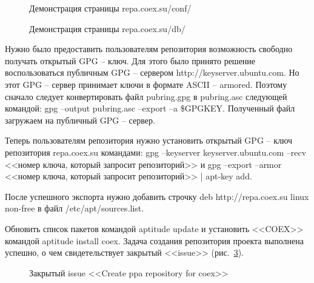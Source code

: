 \begin{figure}[h!]
\caption{ Демонстрация страницы repa.coex.su/conf/ }
\label{kucher_8:kucher_8}
\end{figure}
	
\begin{figure}[h!]
\caption{ Демонстрация страницы repa.coex.su/db/ }
\label{kucher_9:kucher_9}
\end{figure}
	
	
Нужно было предоставить пользователям репозитория возможность свободно получать открытый GPG – ключ. Для этого было принято решение воспользоваться публичным GPG – сервером http://keyserver.ubuntu.com. Но этот GPG – сервер принимает ключи в формате ASCII – armored. Поэтому сначало следует конвертировать файл pubring.gpg в pubring.asc следующей командой: gpg –output pubring.asc –export –a \$GPGKEY. Полученный файл загружаем на публичный GPG – сервер.~\cite{nixp} 

Теперь пользователям репозитория нужно установить открытый GPG – ключ репозитория repa.coex.su командами: gpg --keyserver keyserver.ubuntu.com --recv <<номер ключа, который запросит репозиторий>> и gpg --export --armor <<номер ключа, который запросит репозиторий>> | apt-key add.

После успешного экспорта нужно добавить строчку deb http://repa.coex.su linux non-free в файл /etc/apt/sources.list.

Обновить список пакетов командой aptitude update и установить <<COEX>> командой aptitude install coex. Задача создания репозитория проекта выполнена успешно, о чем свидетельствует закрытый <<issue>> (рис.~\ref{kucher_10:kucher_10}).
	
\begin{figure}[h!]
\caption{ Закрытый issue <<Create ppa repository for coex>> }
\label{kucher_10:kucher_10}
\end{figure}


\clearpage






